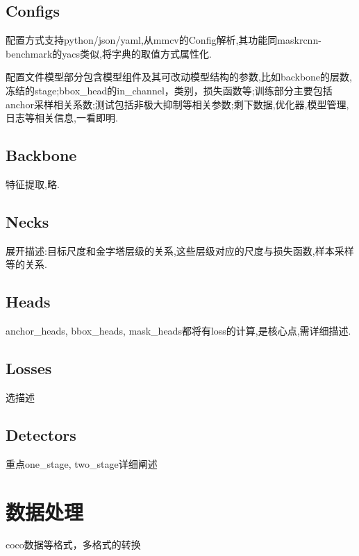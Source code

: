\documentclass[UTF8]{ctexart}
\begin{document}
\subsection{Configs}
配置方式支持python/json/yaml,从mmcv的Config解析,其功能同maskrcnn-benchmark的yacs类似,将字典的取值方式属性化.

配置文件模型部分包含模型组件及其可改动模型结构的参数,比如backbone的层数,冻结的stage;bbox\_head的in\_channel，类别，损失函数等;训练部分主要包括anchor采样相关系数;测试包括非极大抑制等相关参数;剩下数据,优化器,模型管理,日志等相关信息,一看即明.


\subsection{Backbone}
特征提取,略.
\subsection{Necks}
展开描述:目标尺度和金字塔层级的关系,这些层级对应的尺度与损失函数,样本采样等的关系.
\subsection{Heads}
anchor\_heads, bbox\_heads, mask\_heads都将有loss的计算,是核心点,需详细描述.
\subsection{Losses}
选描述
\subsection{Detectors}
重点one\_stage, two\_stage详细阐述

\section{数据处理}
\label{sec:detail}
coco数据等格式，多格式的转换
\end{document}
